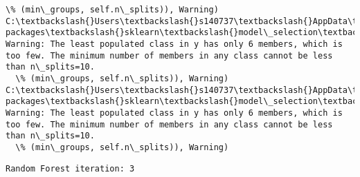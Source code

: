 \documentclass[11pt]{article}
\begin{document}
\begin{Verbatim}[commandchars=\\\{\}]
  \% (min\_groups, self.n\_splits)), Warning)
C:\textbackslash{}Users\textbackslash{}s140737\textbackslash{}AppData\textbackslash{}Local\textbackslash{}Continuum\textbackslash{}anaconda3\textbackslash{}lib\textbackslash{}site-packages\textbackslash{}sklearn\textbackslash{}model\_selection\textbackslash{}\_split.py:605: Warning: The least populated class in y has only 6 members, which is too few. The minimum number of members in any class cannot be less than n\_splits=10.
  \% (min\_groups, self.n\_splits)), Warning)
C:\textbackslash{}Users\textbackslash{}s140737\textbackslash{}AppData\textbackslash{}Local\textbackslash{}Continuum\textbackslash{}anaconda3\textbackslash{}lib\textbackslash{}site-packages\textbackslash{}sklearn\textbackslash{}model\_selection\textbackslash{}\_split.py:605: Warning: The least populated class in y has only 6 members, which is too few. The minimum number of members in any class cannot be less than n\_splits=10.
  \% (min\_groups, self.n\_splits)), Warning)

    \end{Verbatim}

    \begin{Verbatim}[commandchars=\\\{\}]
Random Forest iteration: 3 

    \end{Verbatim}
\end{document}
